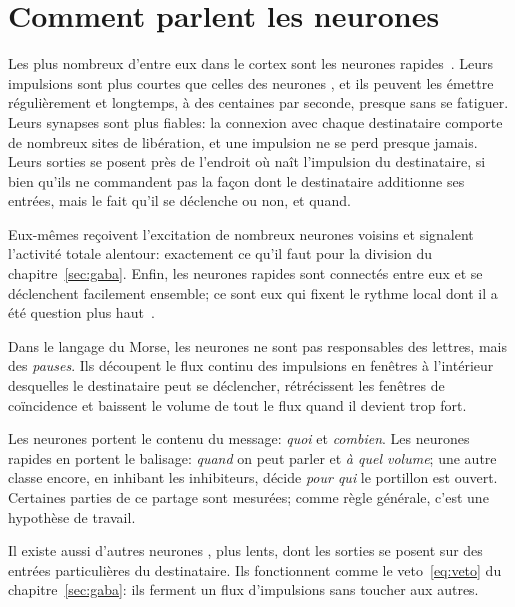 \section{Comment parlent les neurones }

Les plus nombreux d'entre eux dans le cortex sont les neurones rapides~\cite{Tremblay2016}. Leurs impulsions sont plus courtes que celles des neurones , et ils peuvent les émettre régulièrement et longtemps, à des centaines par seconde, presque sans se fatiguer. Leurs synapses sont plus fiables: la connexion avec chaque destinataire comporte de nombreux sites de libération, et une impulsion ne se perd presque jamais. Leurs sorties se posent près de l'endroit où naît l'impulsion du destinataire, si bien qu'ils ne commandent pas la façon dont le destinataire additionne ses entrées, mais le fait qu'il se déclenche ou non, et quand.

Eux-mêmes reçoivent l'excitation de nombreux neurones  voisins et signalent l'activité totale alentour: exactement ce qu'il faut pour la division du chapitre~\ref{sec:gaba}. Enfin, les neurones  rapides sont connectés entre eux et se déclenchent facilement ensemble; ce sont eux qui fixent le rythme local dont il a été question plus haut~\cite{Cardin2009}.

Dans le langage du Morse, les neurones  ne sont pas responsables des lettres, mais des \emph{pauses}. Ils découpent le flux continu des impulsions  en fenêtres à l'intérieur desquelles le destinataire peut se déclencher, rétrécissent les fenêtres de coïncidence et baissent le volume de tout le flux quand il devient trop fort.

\begin{keyblock}
\begin{proposition}
\label{prop:punctuation}
Les neurones  portent le contenu du message: \emph{quoi} et \emph{combien}. Les neurones  rapides en portent le balisage: \emph{quand} on peut parler et \emph{à quel volume}; une autre classe encore, en inhibant les inhibiteurs, décide \emph{pour qui} le portillon est ouvert. Certaines parties de ce partage sont mesurées; comme règle générale, c'est une hypothèse de travail.
\end{proposition}
\end{keyblock}

Il existe aussi d'autres neurones , plus lents, dont les sorties se posent sur des entrées particulières du destinataire. Ils fonctionnent comme le veto~\eqref{eq:veto} du chapitre~\ref{sec:gaba}: ils ferment un flux d'impulsions  sans toucher aux autres.

